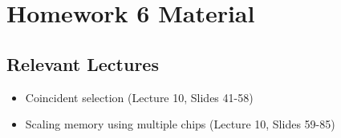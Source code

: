\documentclass{../slides}
\begin{document}
\section{Homework 6 Material}
\subsection{Relevant Lectures}
\begin{itemize}
    \item Coincident selection (Lecture 10, Slides 41-58)
    \item Scaling memory using multiple chips (Lecture 10, Slides 59-85)
\end{itemize}
\end{document}
